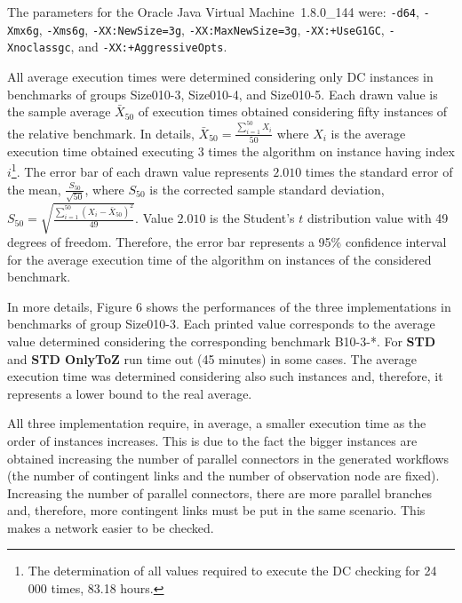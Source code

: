 \documentclass[a4paper,11pt]{article}
\begin{document}
The parameters for the Oracle Java Virtual Machine~1.8.0\_144 were: \texttt{-d64}, \texttt{-Xmx6g}, \texttt{-Xms6g}, \texttt{-XX:NewSize=3g}, \texttt{-XX:MaxNewSize=3g}, \texttt{-XX:+UseG1GC}, \texttt{-Xnoclassgc}, and \texttt{-XX:+AggressiveOpts}. 

All average execution times were determined considering only DC instances in benchmarks of groups Size010-3, Size010-4, and Size010-5.
Each drawn value is the sample average $\bar{X}_{50}$ of execution times obtained considering fifty instances of the relative benchmark. 
In details, $\bar{X}_{50}=\frac{\sum_{i=1}^{50} X_i}{50}$ where $X_i$ is the average execution time obtained executing 3 times the algorithm on instance having index $i$\footnote{The determination of all values required to execute the DC checking for 24 000 times, 83.18 hours.}.
The error bar of each drawn value represents $2.010$ times the standard error of the mean, $\frac{S_{50}}{\sqrt{50}}$, where $S_{50}$ is the corrected sample standard deviation, $S_{50}= \sqrt{\frac{\sum_{i=1}^{50} (X_i-\bar{X}_{50})^2}{49}}$. Value $2.010$ is the Student's $t$ distribution value with 49 degrees of freedom. 
Therefore, the error bar represents a 95\% confidence interval for the average execution time of the algorithm on instances of the considered benchmark.

In more details, Figure 6 shows the performances of the three implementations in benchmarks of group Size010-3. 
Each printed value corresponds to the average value determined considering the corresponding benchmark B10-3-*.
For \textbf{STD} and \textbf{STD OnlyToZ} run time out (45 minutes) in some cases. The average execution time was determined considering also such instances and, therefore, it represents a lower bound to the real average.

All three implementation require, in average, a smaller execution time as the order of instances increases. 
This is due to the fact the bigger instances are obtained increasing the number of parallel connectors in the generated workflows (the number of contingent links and the number of observation node are fixed). Increasing the number of parallel connectors, there are more parallel branches and, therefore, more contingent links must be put in the same scenario.
This makes a network easier to be checked. 
\end{document}
